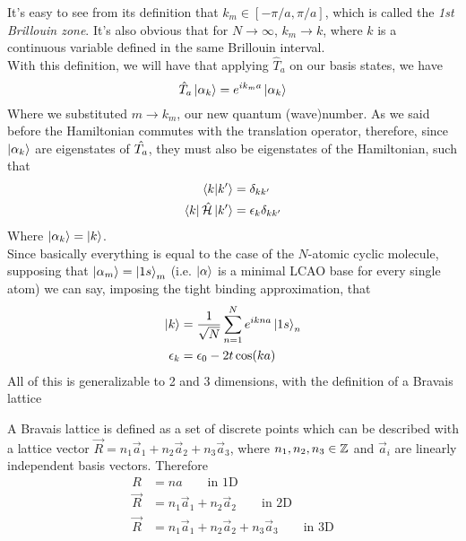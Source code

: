 \documentclass[../qm.tex]{subfiles}
\begin{document}
It's easy to see from its definition that $k_m\in[-\pi/a,\pi/a]$, which is called the \emph{1st Brillouin zone}. It's also obvious that for $N\to\infty$, $k_m\to k$, where $k$ is a continuous variable defined in the same Brillouin interval.\\
With this definition, we will have that applying $\hat{T}_a$ on our basis states, we have
\begin{equation}
	\hat{T}_a\ket{\alpha_k}=e^{ik_ma}\ket{\alpha_k}
	\label{eq:brillouintrans}
\end{equation}
Where we substituted $m\to k_m$, our new quantum (wave)number. As we said before the Hamiltonian commutes with the translation operator, therefore, since $\ket{\alpha_k}$ are eigenstates of $\hat{T_a}$, they must also be eigenstates of the Hamiltonian, such that
\begin{equation}
	\begin{aligned}
		\bra{k}\ket{k'}&=\delta_{kk'}\\
		\bra{k}\hat{\mathcal{H}}\ket{k'}&=\epsilon_{k}\delta_{kk'}
	\end{aligned}
	\label{eq:hamonbrill}
\end{equation}
Where $\ket{\alpha_k}=\ket{k}$.\\
Since basically everything is equal to the case of the $N$-atomic cyclic molecule, supposing that $\ket{\alpha_m}=\ket{1s}_m$ (i.e. $\ket{\alpha}$ is a minimal LCAO base for every single atom) we can say, imposing the tight binding approximation, that
\begin{equation}
	\begin{aligned}
		\ket{k}&=\frac{1}{\sqrt{N}}\sum_{n=1}^Ne^{ikna}\ket{1s}_n\\
		\epsilon_k&=\epsilon_0-2t\cos(ka)
	\end{aligned}
	\label{eq:chainenwf}
\end{equation}
All of this is generalizable to 2 and 3 dimensions, with the definition of a Bravais lattice
\begin{defn}
	A Bravais lattice is defined as a set of discrete points which can be described with a lattice vector $\vec{R}=n_1\vec{a}_1+n_2\vec{a}_2+n_3\vec{a}_3$, where $n_1,n_2,n_3\in\mathbb{Z}$ and $\vec{a}_i$ are linearly independent basis vectors. Therefore
	\begin{equation}
		\begin{aligned}
			R&=na\qquad\text{in 1D}\\
			\vec{R}&=n_1\vec{a}_1+n_2\vec{a}_2\qquad\text{in 2D}\\
			\vec{R}&=n_1\vec{a}_1+n_2\vec{a}_2+n_3\vec{a}_3\qquad\text{in 3D}
		\end{aligned}
		\label{eq:bravaisvector}
	\end{equation}
\end{defn}
\end{document}
